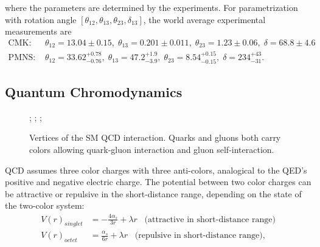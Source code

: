 \noindent where the parameters are determined by the experiments. For parametrization with rotation angle $[ \theta_{12},\theta_{13},\theta_{23},\delta_{13}] $, the world average experimental measurements are
\begin{align}
    \text{CMK: } & \theta_{12}=13.04\pm0.15, \; \theta_{13}=0.201\pm0.011, \; \theta_{23}=1.23\pm0.06, \; \delta = 68.8\pm 4.6  \\
    \text{PMNS: } &\theta_{12}=33.62 ^{+0.78}_{-0.76}, \;  \theta_{13}=47.2  ^{+1.9}_{-3.9}, \; \theta_{23}= 8.54 ^{+0.15}_{-0.15}, \;  \delta = 234 ^{+43}_{-31}.
\end{align}


\subsection{Quantum Chromodynamics}
\label{sec:relatedWorks:qft:qcd}



\begin{figure}[ht]
    \centering
    ; \qquad
    ; \qquad
    ;    
    \caption{Vertices of the SM QCD interaction. Quarks and gluons both carry colors allowing quark-gluon interaction and gluon self-interaction. }
    \label{fig:my_label}
\end{figure}

QCD assumes three color charges with three anti-colors, analogical to the QED's positive and negative electric charge. The potential between two color charges can be attractive or repulsive in the short-distance range, depending on the state of the two-color system:
\begin{align}
	 V(r)_{singlet} &= -\frac{4\alpha_s}{3r} + \lambda r \;\;\; \text{(attractive in short-distance range)}\\
    V(r)_{octet} &= \frac{\alpha_s}{6r} + \lambda r \;\;\; \text{(repulsive in short-distance range)}, 
\end{align}


